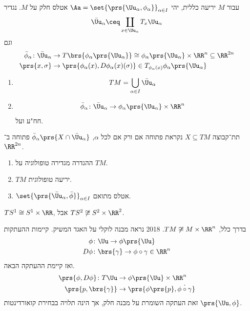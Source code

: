 \documentclass[a4paper,10pt,twoside,openany]{book}
\begin{document}
\begin{definition}
עבור
$M$
יריעה כללית, יהי
$\Aa = \set{\prs{\Uu_{\alpha}, \phi_{\alpha}}}_{\alpha \in I}$
אטלס חלק על
$M$.
נגדיר
\[\bar{\Uu}_{\alpha} \ceq \coprod_{x \in \Uu_{\alpha}} T_x \Uu_{\alpha}\]
וגם
\begin{align*}
\bar{\phi}_{\alpha} \colon \bar{\Uu}_{\alpha} &\to T\brs{\phi_{\alpha}\prs{\Uu_{\alpha}}} \cong \phi_{\alpha}\prs{\Uu_{\alpha}}\times \RR^n \subseteq \RR^{2n} \\
\prs{x, \sigma} &\to \prs{\phi_{\alpha}(x), D\phi_{\alpha}(x)(\sigma)} \in T_{\phi_{\alpha}(x)}\phi_{\alpha}\prs{\Uu_{\alpha}}
\end{align*}
\end{definition}

\begin{exercise}
\begin{enumerate}
\item \[TM = \bigcup_{\alpha \in I} \bar{\Uu}_{\alpha}\]
\item \[\bar{\phi}_{\alpha} \colon \bar{\Uu}_{\alpha} \to \phi_{\alpha}\prs{\Uu_{\alpha}}\times \RR^n\]
חח"ע ועל.
\end{enumerate}
\end{exercise}
\begin{definition}
תת־קבוצה
$X \subseteq TM$
נקראת פתוחה אם ורק אם לכל
$\alpha$,
$\bar{\phi}_{\alpha}\prs{X \cap \bar{\Uu}_{\alpha}}$
פתוחה ב־%
$\RR^{2n}$.
\end{definition}
\begin{exercise}
\begin{enumerate}
הראו בשלבים הבאים כי יש מבנה חלק על
$TM$.
\item ההגדרה מגדירה טופולוגיה על
$TM$.
\item $TM$
יריעה טופולוגית.
\item $\set{\prs{\bar{\Uu}_{\alpha}, \bar{\phi}}}_{\alpha \in I}$
אטלס מתואם.
\end{enumerate}
\end{exercise}
\begin{remark}
$TS^{1} \cong S^1 \times \RR$,
אבל
$TS^2 \not\cong S^2 \times \RR^2$.
\end{remark}
\begin{remark}
בדרך כלל,
$TM \not\cong M\times\RR^n$.%
%
{2018}
נראה מבנה לוקלי על האגד המשיק. קיימות ההעתקות
\begin{align*}
\phi &\colon \Uu \to \phi\prs{\Uu} \\
D\phi &\colon \brs{\gamma} \to \phi \circ \gamma \in \RR^n
\end{align*}
ואז קיימת ההעתקה הבאה.
\begin{align*}
\prs{\phi,D\phi} \colon T\Uu &\to \phi\prs{\Uu} \times \RR^n\\
\prs{p, \brs{\gamma}} &\to \prs{\phi\prs{p}, \dot{\phi \circ \gamma}}
\end{align*}
זאת העתקה השומרת על מבנה חלק, אך הינה תלויה בבחירת קואורדינטות
$\prs{\Uu, \phi}$.
\end{remark}
\end{document}
